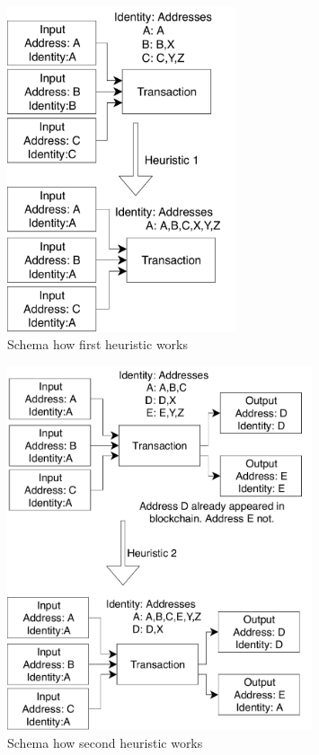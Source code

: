 \documentclass[
  digital, %
  table,   %
  lof,     %
  lot,     %
  oneside
]{fithesis3}
\begin{document}
\begin{figure}[!htb]
    \centering
    \includegraphics[width=0.6\textwidth]{heur1.pdf}
    \caption{Schema how first heuristic works}
    \label{heur1}
\end{figure}

\begin{figure}[!htb]
    \centering
    \includegraphics[width=0.8\textwidth]{heur2.pdf}
    \caption{Schema how second heuristic works}
    \label{heur2}
\end{figure}
\end{document}
